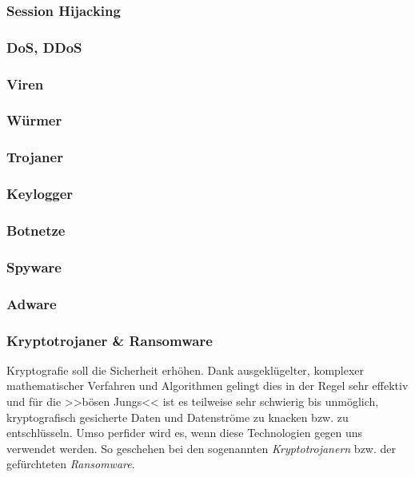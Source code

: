 \subsubsection{Session Hijacking}
\label{sec:SessionHijacking}

\subsubsection{DoS, DDoS}
\label{sec:DoSDDoS}

\subsubsection{Viren}
\label{sec:Viren}

\subsubsection{Würmer}
\label{sec:Wuermer}

\subsubsection{Trojaner}
\label{sec:Trojaner}

\subsubsection{Keylogger}
\label{sec:Keylogger}

\subsubsection{Botnetze}
\label{sec:Botnetze}

\subsubsection{Spyware}
\label{sec:Spyware}

\subsubsection{Adware}
\label{sec:Adware}

\subsubsection{Kryptotrojaner \& Ransomware}
\label{sec:Ransomware}

Kryptografie soll die Sicherheit erhöhen. Dank ausgeklügelter, komplexer mathematischer Verfahren und Algorithmen gelingt dies in der Regel sehr effektiv und für die >>bösen Jungs<< ist es teilweise sehr schwierig bis unmöglich, kryptografisch gesicherte Daten und Datenströme zu knacken bzw. zu entschlüsseln. Umso perfider wird es, wenn diese Technologien gegen uns verwendet werden. So geschehen bei den sogenannten \textit{Kryptotrojanern} bzw. der gefürchteten \textit{Ransomware}.

